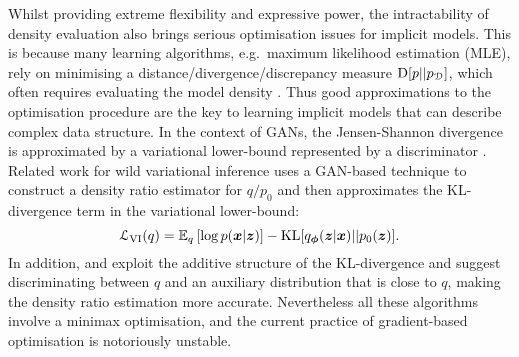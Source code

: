 Whilst providing extreme flexibility and expressive power, the intractability of density evaluation also brings serious optimisation issues for implicit models. This is because many learning algorithms, e.g.~maximum likelihood estimation (MLE), rely on minimising a distance/divergence/discrepancy measure $\mathrm{D}[p || p_{\mathcal{D}}]$, which often requires evaluating the model density \citep[c.f.][]{ranganath:ovi2016, liu:two_wild2016}. Thus good approximations to the optimisation procedure are the key to learning implicit models that can describe complex data structure. In the context of GANs, the Jensen-Shannon divergence is approximated by a variational lower-bound represented by a discriminator \citep{barber:vim2003, goodfellow:gan2014}. 
%
Related work for wild variational inference \citep{li:wild2016, mescheder:avb2017, huszar:implicit2017, tran:implicit2017} uses a GAN-based technique to construct a density ratio estimator for $q / p_0$ \citep{sugiyama:ratio2009, sugiyama:ratio2012, uehara:gan2016, mohamed:gan2016} and then approximates the KL-divergence term in the variational lower-bound:
\begin{equation}
\mathcal{L}_{\text{VI}}(q) = \mathbb{E}_{q} \left[ \log p(\bm{x} | \bm{z}) \right] - \mathrm{KL}[q_{\bm{\phi}}(\bm{z}|\bm{x}) || p_0(\bm{z})].
\end{equation} 
In addition, \cite{li:wild2016} and \cite{mescheder:avb2017} exploit the additive structure of the KL-divergence and suggest discriminating between $q$ and an auxiliary distribution that is close to $q$, making the density ratio estimation more accurate. Nevertheless all these algorithms involve a minimax optimisation, and the current practice of gradient-based optimisation is notoriously unstable. 

